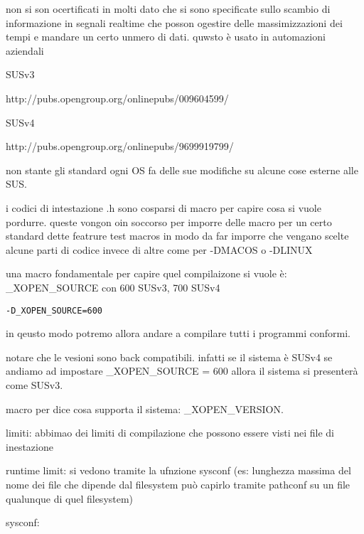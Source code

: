 non si son ocertificati in molti dato che si sono specificate sullo scambio di informazione in segnali realtime che posson ogestire delle massimizzazioni dei tempi e mandare un certo unmero di dati. quwsto è usato in automazioni aziendali 

SUSv3

http://pubs.opengroup.org/onlinepubs/009604599/

SUSv4

http://pubs.opengroup.org/onlinepubs/9699919799/


non stante gli standard ogni OS fa delle sue modifiche su alcune cose esterne alle SUS.

i codici di intestazione .h sono cosparsi di macro per capire cosa si vuole pordurre. queste vongon oin soccorso per imporre delle macro per un certo standard dette featrure test macros in modo da far imporre che vengano scelte alcune parti di codice invece di altre come per -DMACOS o -DLINUX

una macro fondamentale per capire quel compilaizone si vuole è: _XOPEN_SOURCE con 600 SUSv3, 700 SUSv4

\begin{lstlisting}
-D_XOPEN_SOURCE=600
\end{lstlisting}

in qeusto modo potremo allora andare a compilare tutti i programmi conformi.

notare che le vesioni sono back compatibili. infatti se il sistema è SUSv4 se andiamo ad impostare _XOPEN_SOURCE = 600 allora il sistema si presenterà come SUSv3.


macro per dice cosa supporta il sistema: _XOPEN_VERSION.



limiti:
abbimao dei limiti di compilazione che possono essere visti nei file di inestazione

runtime limit: si vedono tramite la ufnzione sysconf (es: lunghezza massima del nome dei file che dipende dal filesystem può capirlo tramite pathconf su un file qualunque di quel filesystem)

sysconf:
